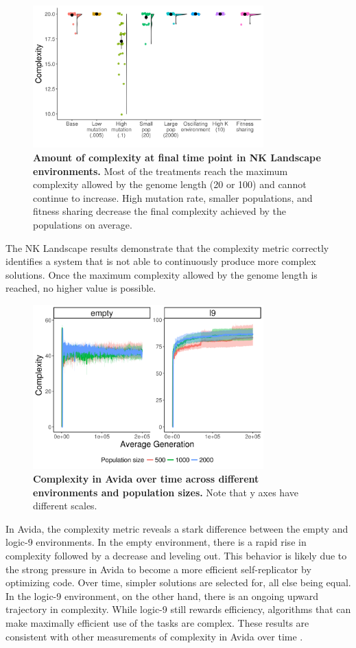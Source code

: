 \documentclass[letterpaper]{article}
\begin{document}
\begin{figure}
\includegraphics[width=3.5in]{figs/complexityboxplots.png}
\caption{\textbf{Amount of complexity at final time point in NK Landscape environments.} Most of the treatments reach the maximum complexity allowed by the genome length (20 or 100) and cannot continue to increase. High mutation rate, smaller populations, and fitness sharing decrease the final complexity achieved by the populations on average.}
\label{complexity}
\end{figure}

The NK Landscape results demonstrate that the complexity metric correctly identifies a system that is not able to continuously produce more complex solutions. Once the maximum complexity allowed by the genome length is reached, no higher value is possible. 

\begin{figure}
    \centering
    \includegraphics[width=3.5in]{figs/avida_env_complexity.png}
    \caption{\textbf{Complexity in Avida over time across different environments and population sizes.} Note that y axes have different scales.}
    \label{fig:avida_env_complexity}
\end{figure}

In Avida, the complexity metric reveals a stark difference between the empty and logic-9 environments. In the empty environment, there is a rapid rise in complexity followed by a decrease and leveling out. This behavior is likely due to the strong pressure in Avida to become a more efficient self-replicator by optimizing code. Over time, simpler solutions are selected for, all else being equal. In the logic-9 environment, on the other hand, there is an ongoing upward trajectory in complexity. While logic-9 still rewards efficiency, algorithms that can make maximally efficient use of the tasks are complex. These results are consistent with other measurements of complexity in Avida over time \citep{adami_evolution_2000}.
\end{document}
